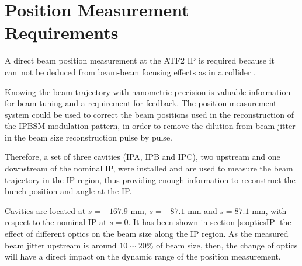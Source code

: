 {{\section{Position Measurement Requirements}
A direct beam position measurement at the ATF2 IP is required because it can~not be deduced from beam-beam focusing effects as in a collider \cite{Bambade:1989pb}.\par
Knowing the beam trajectory with nanometric precision is valuable information for beam tuning and a requirement for feedback. The position measurement system could be used to correct the beam positions used in the reconstruction of the IPBSM modulation pattern, in order to remove the dilution from beam jitter in the beam size reconstruction pulse by pulse.\par
Therefore, a set of three cavities (IPA, IPB and IPC), two upstream and one downstream of the nominal IP, were installed and are used to measure the beam trajectory in the IP region, thus providing enough information to reconstruct the bunch position and angle at the IP.\par
Cavities are located at $s=-167.9$ mm, $s=-87.1$ mm and $s=87.1$ mm, with respect to the nominal IP at $s=0$. It has been shown in section \ref{s:opticsIP} the effect of different optics on the beam size along the IP region. As the measured beam jitter upstream is around $10\sim20$\% of beam size, then, the change of optics will have a direct impact on the dynamic range of the position measurement.\par %
}}
